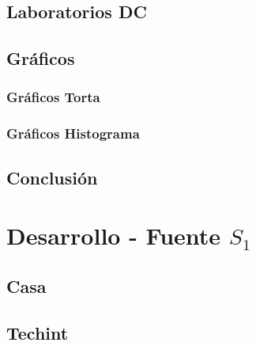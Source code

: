 \documentclass[final,narroweqnarray,inline]{ieee}
\begin{document}
  \subsection{Laboratorios DC}

  \subsection{Gráficos}
  \subsubsection*{Gráficos Torta}
  \subsubsection*{Gráficos Histograma}

  \subsection{Conclusión}

\newpage
\section{Desarrollo - Fuente $S_1$}
  \subsection{Casa}

  \subsection{Techint}
\end{document}
